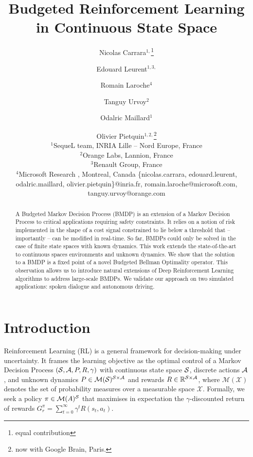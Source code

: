 \documentclass{article}
\title{Budgeted Reinforcement Learning in Continuous State Space}
\author{
Nicolas Carrara$^{1,}$\thanks{equal contribution}\and
Edouard Leurent$^{1,3,}$\footnotemark[1]\and
Romain Laroche$^{4}$\and
Tanguy Urvoy$^{2}$\and
Odalric Maillard$^{1}$\and
Olivier Pietquin$^{1,2,}$\thanks{now with Google Brain, Paris.}\\
\affiliations $^1$SequeL team, INRIA Lille -- Nord Europe, France\\
$^2$Orange Labs, Lannion, France\\
$^3$Renault Group, France\\
$^4$Microsoft Research , Montreal, Canada
\emails
\{nicolas.carrara, edouard.leurent, odalric.maillard, olivier.pietquin\}@inria.fr,
romain.laroche@microsoft.com, tanguy.urvoy@orange.com
}
\begin{document}
\maketitle
\begin{abstract}
    A Budgeted Markov Decision Process (BMDP) is an extension of a Markov Decision Process to critical applications requiring safety constraints. It relies on a notion of risk implemented in the shape of a cost signal constrained  to lie below a threshold that -- importantly -- can be modified in real-time. So far, BMDPs could only be solved in the case of finite state spaces with known dynamics. This work extends the state-of-the-art to continuous spaces environments and unknown dynamics. We show that the solution to a BMDP is a fixed point of a novel Budgeted Bellman Optimality operator. This observation allows us to introduce natural extensions of Deep Reinforcement Learning algorithms to address large-scale BMDPs. We validate our approach on two simulated applications: spoken dialogue and autonomous driving.
\end{abstract}


\section{Introduction}

Reinforcement Learning (RL) is a general framework for decision-making under uncertainty. It frames the learning objective as the optimal control of a Markov Decision Process  $(\mathcal{S}, \mathcal{A}, P, R, \gamma)$ with continuous state space $\mathcal{S}$, discrete actions $\mathcal{A}$, and unknown dynamics $P\in \mathcal{M}(\mathcal{S})^{\mathcal{S} \times \mathcal{A}}$ and rewards $R\in\mathbb{R}^{\mathcal{S} \times \mathcal{A}}$, where $\mathcal{M}(\mathcal{X})$ denotes the set of probability measures over a measurable space $\mathcal{X}$. Formally, we seek a policy $\pi\in\mathcal{M}(A)^{\mathcal{S}}$ that maximises in expectation the $\gamma$-discounted return of rewards $G_r^\pi = \sum_{t=0}^\infty \gamma^t R(s_t, a_t)$.
\end{document}
